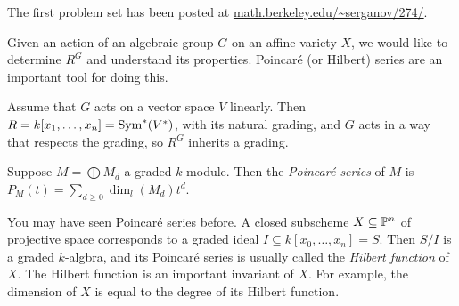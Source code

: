 
The first problem set has been posted at \url{math.berkeley.edu/~serganov/274/}.

Given an action of an algebraic group $G$ on an affine variety $X$, we would like to determine $R^G$ and understand its properties. Poincar\'e (or Hilbert) series are an important tool for doing this.

Assume that $G$ acts on a vector space $V$ linearly. Then $R=k[x_1,\dots, x_n]=\operatorname{Sym}^*(V^*)$, with its natural grading, and $G$ acts in a way that respects the grading, so $R^G$ inherits a grading. 
\begin{definition}
 Suppose $M=\bigoplus M_d$ a graded $k$-module. Then the \emph{Poincar\'e series} of $M$ is $P_M(t) = \sum_{d\ge 0} \dim_l(M_d) t^d$.
\end{definition}
\begin{remark}
 You may have seen Poincar\'e series before. A closed subscheme $X\subseteq \mathbb{P}^n$ of projective space corresponds to a graded ideal $I\subseteq k[x_0,\dots, x_n]=S$. Then $S/I$ is a graded $k$-algbra, and its Poincar\'e series is usually called the \emph{Hilbert function} of $X$. The Hilbert function is an important invariant of $X$. For example, the dimension of $X$ is equal to the degree of its Hilbert function.
\end{remark}

